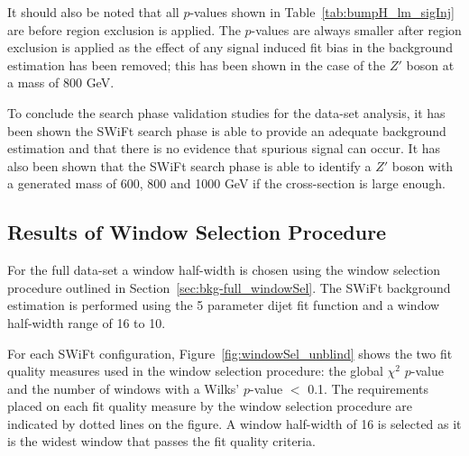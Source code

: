It should also be noted that all \bh{} $p$-values shown in Table~\ref{tab:bumpH_lm_sigInj} are before region exclusion is applied.
The \bh{} \mbox{$p$-value}s are always smaller after region exclusion is applied
as the effect of any signal induced fit bias in the background estimation has been removed;
this has been shown in the case of the $Z'$ boson at a mass of 800 GeV.

To conclude the search phase validation studies for the \lm{} data-set analysis,
it has been shown the SWiFt search phase is
able to provide an adequate background estimation 
and that there is no evidence that spurious signal can occur.
It has also been shown that 
the SWiFt search phase is able to identify a
$Z'$ boson with a generated mass of 600, 800 and 1000 GeV if the cross-section is large enough.

\vspace{0.5em}
\subsection{Results of Window Selection Procedure}
\label{sec:bkg-full_windowSelResults}

For the full \lm{} data-set a window half-width is chosen using the window selection procedure outlined in Section~\ref{sec:bkg-full_windowSel}.
The SWiFt background estimation is performed using the 5 parameter dijet fit function and a window half-width range of 16 to 10.

For each SWiFt configuration, Figure~\ref{fig:windowSel_unblind} shows the two fit quality measures used in the window selection procedure:
the global $\chi^2$ $p$-value and the number of windows with a Wilks' $p$-value $<$ 0.1.
The requirements placed on each fit quality measure by the window selection procedure are indicated by dotted lines on the figure.
A window half-width of 16 is selected as it is the widest window that passes the fit quality criteria.

